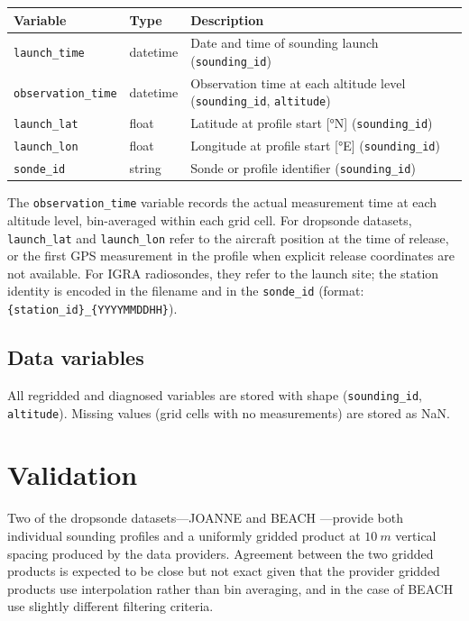 \documentclass[11pt]{article}
\begin{document}
\begin{center}
\begin{tabular}{lll}
\toprule
Variable & Type & Description \\
\midrule
\texttt{launch\_time}        & datetime & Date and time of sounding launch (\texttt{sounding\_id}) \\
\texttt{observation\_time}  & datetime & Observation time at each altitude level (\texttt{sounding\_id}, \texttt{altitude}) \\
\texttt{launch\_lat}        & float    & Latitude at profile start [\si{\degree}N] (\texttt{sounding\_id}) \\
\texttt{launch\_lon}        & float    & Longitude at profile start [\si{\degree}E] (\texttt{sounding\_id}) \\
\texttt{sonde\_id}          & string   & Sonde or profile identifier (\texttt{sounding\_id}) \\
\bottomrule
\end{tabular}
\end{center}

\noindent The \texttt{observation\_time} variable records the actual measurement time at each altitude level, bin-averaged within each grid cell.  For dropsonde datasets, \texttt{launch\_lat} and \texttt{launch\_lon} refer to the aircraft position at the time of release, or the first GPS measurement in the profile when explicit release coordinates are not available.  For IGRA radiosondes, they refer to the launch site; the station identity is encoded in the filename and in the \texttt{sonde\_id} (format: \texttt{\{station\_id\}\_\{YYYYMMDDHH\}}).

\subsection{Data variables}

All regridded and diagnosed variables are stored with shape (\texttt{sounding\_id}, \texttt{altitude}).  Missing values (grid cells with no measurements) are stored as NaN.



\section{Validation} \label{sec:validation}

Two of the dropsonde datasets---JOANNE \citep{george2021} and BEACH \citep{gloeckner2025}---provide both individual sounding profiles and a uniformly gridded product at $\SI{10}{m}$ vertical spacing produced by the data providers. 
Agreement between the two gridded products is expected to be close but not exact given that the provider gridded products use interpolation rather than bin averaging, and in the case of BEACH use slightly different filtering criteria.
\end{document}
